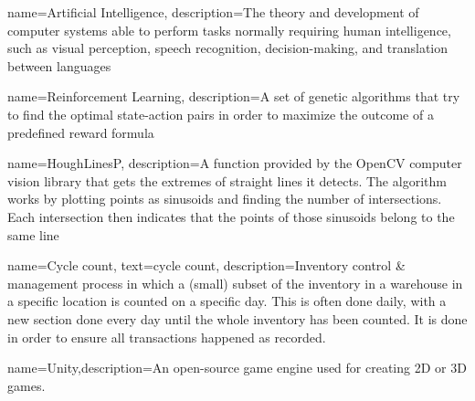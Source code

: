 
{
	name={Artificial Intelligence},
	description={The theory and development of computer systems able to perform tasks normally requiring human intelligence, such as visual perception, speech recognition, decision-making, and translation between languages \citep{ai_def}}
}

{
	name={Reinforcement Learning},
	description={A set of genetic algorithms that try to find the optimal state-action pairs in order to maximize the outcome of a predefined reward formula}
}

{
	name={HoughLinesP},
	description={A function provided by the OpenCV computer vision library that gets the extremes of straight lines it detects. The algorithm works by plotting points as sinusoids and finding the number of intersections. Each intersection then indicates that the points of those sinusoids belong to the same line \citep{houghLinesP}}
}

{
	name={Cycle count},
	text={cycle count},
	description={Inventory control \& management process in which a (small) subset of the inventory in a warehouse in a specific location is counted on a specific day. This is often done daily, with a new section done every day until the whole inventory has been counted. It is done in order to ensure all transactions happened as recorded.}
}

{
	name={Unity},description={An open-source game engine used for creating 2D or 3D games.}
}



